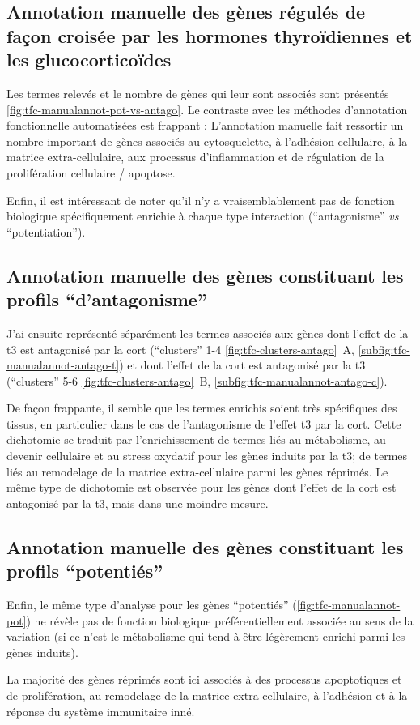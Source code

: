 \documentclass[../main.tex]{subfiles}
\begin{document}
	\subsection{Annotation manuelle des gènes régulés de façon croisée par les hormones thyroïdiennes et les glucocorticoïdes}
		Les termes relevés et le nombre de gènes qui leur sont associés sont présentés \autoref{fig:tfc-manualannot-pot-vs-antago}.
		Le contraste avec les méthodes d'annotation fonctionnelle automatisées est frappant :
		L'annotation manuelle fait ressortir un nombre important de gènes associés au cytosquelette, à l'adhésion cellulaire, à la matrice extra-cellulaire, aux processus d'inflammation et de régulation de la prolifération cellulaire / apoptose.

		

		Enfin, il est intéressant de noter qu'il n'y a vraisemblablement pas de fonction biologique spécifiquement enrichie à chaque type interaction (``antagonisme'' \textit{vs} ``potentiation'').


	\subsection{Annotation manuelle des gènes constituant les profils ``d'antagonisme''}
		J'ai ensuite représenté séparément les termes associés aux gènes dont l'effet de la \gls{t3} est antagonisé par la \gls{cort} (``clusters'' 1-4 \autoref{fig:tfc-clusters-antago}~A, \autoref{subfig:tfc-manualannot-antago-t}) et dont l'effet de la \gls{cort} est antagonisé par la \gls{t3} (``clusters'' 5-6 \autoref{fig:tfc-clusters-antago}~B, \autoref{subfig:tfc-manualannot-antago-c}).

		

		De façon frappante, il semble que les termes enrichis soient très spécifiques des tissus, en particulier dans le cas de l'antagonisme de l'effet \gls{t3}
		par la \gls{cort}.
		Cette dichotomie se traduit par l'enrichissement de termes liés au métabolisme, au devenir cellulaire et au stress oxydatif pour les gènes induits par la \gls{t3}; de termes liés au remodelage de la matrice extra-cellulaire parmi les gènes réprimés.
		Le même type de dichotomie est observée pour les gènes dont l'effet de la \gls{cort} est antagonisé par la \gls{t3}, mais dans une moindre mesure.


	\subsection{Annotation manuelle des gènes constituant les profils ``potentiés''}
		Enfin, le même type d'analyse pour les gènes ``potentiés'' (\autoref{fig:tfc-manualannot-pot}) ne révèle pas de fonction biologique préférentiellement associée au sens de la variation (si ce n'est le métabolisme qui tend à être légèrement enrichi parmi les gènes induits).

		

		La majorité des gènes réprimés sont ici associés à des processus apoptotiques et de prolifération, au remodelage de la matrice extra-cellulaire, à l'adhésion et à la réponse du système immunitaire inné.
\end{document}
